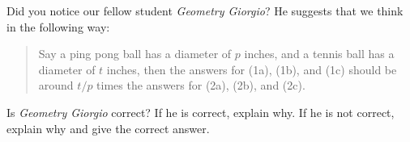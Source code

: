 \documentclass[handout,noauthor,nooutcomes,hints]{ximera}
\begin{document}
\mynewpage

\begin{question}
Did you notice our fellow student \textit{Geometry Giorgio}? He
suggests that we think in the following way:
\begin{quote}
  Say a ping pong ball has a diameter of $p$ inches, and a
tennis ball has a diameter of $t$ inches, then the answers for
(1a), (1b), and (1c) should be around $t/p$ times the answers for
(2a), (2b), and (2c).
\end{quote}
Is \textit{Geometry Giorgio} correct?  If he is
correct, explain why. If he is not correct, explain why and give the
correct answer.
\end{question}
\end{document}
